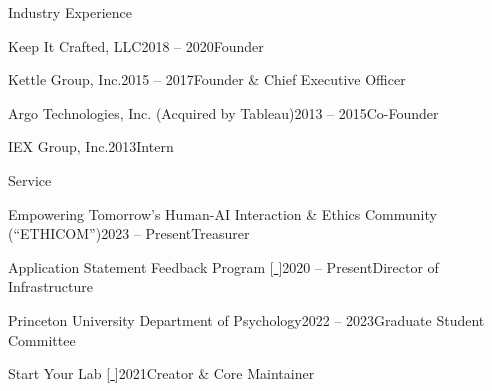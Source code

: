 \documentclass{cv} %
\begin{document}

\begin{cvSection}{Industry Experience}

  \begin{cvSubsectionWork}{Keep It Crafted, LLC}{2018 -- 2020}{Founder}
  \end{cvSubsectionWork}

  \begin{cvSubsectionWork}{Kettle Group, Inc.}{2015 -- 2017}{Founder \& Chief Executive Officer}
  \end{cvSubsectionWork}

  \begin{cvSubsectionWork}{Argo Technologies, Inc. (Acquired by Tableau)}{2013 -- 2015}{Co-Founder}
  \end{cvSubsectionWork}

  \begin{cvSubsectionWork}{IEX Group, Inc.}{2013}{Intern}
  \end{cvSubsectionWork}

\end{cvSection}


\begin{cvSection}{Service}

  \begin{cvSubsectionWork}{Empowering Tomorrow's Human-AI Interaction \& Ethics Community (``ETHICOM'')}{2023 -- Present}{Treasurer}
  \end{cvSubsectionWork}

  \begin{cvSubsectionWork}{Application Statement Feedback Program [\href{https://www.asfp.io/}{ }]}{2020 -- Present}{Director of Infrastructure}
  \end{cvSubsectionWork}

  \begin{cvSubsectionWork}{Princeton University Department of Psychology}{2022 -- 2023}{Graduate Student Committee}
  \end{cvSubsectionWork}

  \begin{cvSubsectionWork}{Start Your Lab [\href{https://www.startyourlab.com/}{ }]}{2021}{Creator \& Core Maintainer}
  \end{cvSubsectionWork}

\end{cvSection}
\end{document}
